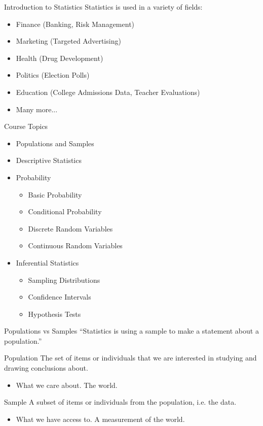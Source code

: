 \documentclass{beamer}
\begin{document}
\begin{frame}{Introduction to Statistics}
Statistics is used in a variety of fields:
\begin{itemize}
\item Finance (Banking, Risk Management)
\item Marketing (Targeted Advertising)
\item Health (Drug Development)
\item Politics (Election Polls) 
\item Education (College Admissions Data, Teacher Evaluations) 
\item Many more...
\end{itemize}
\end{frame}

\begin{frame}{Course Topics}
\begin{itemize}
\item Populations and Samples
\item Descriptive Statistics
\item Probability
\begin{itemize}
\item Basic Probability
\item Conditional Probability
\item Discrete Random Variables
\item Continuous Random Variables
\end{itemize}
\item Inferential Statistics
\begin{itemize}
\item Sampling Distributions
\item Confidence Intervals
\item Hypothesis Tests
\end{itemize}
\end{itemize}
\end{frame}

\begin{frame}{Populations vs Samples}
``Statistics is using a \alert{sample} to make a statement about a \alert{population}.''

\begin{block}{ Population}
 The set of items or individuals that we are interested in studying and drawing conclusions about.
 \begin{itemize}
 \item What we care about. The world. 
 \end{itemize}
\end{block}
\begin{block}{ Sample}
 A subset of items or individuals from the population, i.e. 
 the data.
  \begin{itemize}
 \item What we have access to. A measurement of the world. 
 \end{itemize}
\end{block}
\end{frame}
\end{document}
